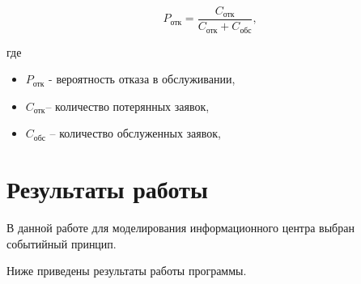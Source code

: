\documentclass[a4paper,12pt]{article}
\begin{document}
	\begin{equation}
	P_{\text{отк}} = \frac{C_{\text{отк}}}{C_{\text{отк}} + C_{\text{обс}}},
	\end{equation}
	
	где
	\begin{itemize}
		\item $P_{\text{отк}}$ - вероятность отказа в обслуживании,
		\item $C_{\text{отк}}$– количество потерянных заявок,
		\item $C_{\text{обс}}$ – количество обслуженных заявок,
	\end{itemize}

	\newpage
	
	\section*{Результаты работы}
	
	В данной работе для моделирования информационного центра выбран событийный принцип.
	
	Ниже приведены результаты работы программы.
	
\end{document}

